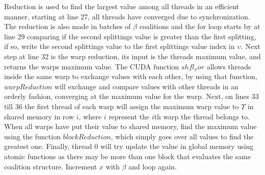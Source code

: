 \documentclass{llncs}
\begin{document}
Reduction is used to find the largest value among all threads in an efficient manner, starting at line 27, all threads have converged due to synchronization. The reduction is also made in batches of $\beta$ coalitions and the for loop starts by at line 29 comparing if the second splittings value is greater than the first splitting, if so, write the second splittings value to the first splittings value index in $\upsilon$. Next step at line 32 is the warp reduction, its input is the threads maximum value, and returns the warps maximum value. The CUDA function $shfl_xor$ allows threads inside the same warp to exchange values with each other, by using that function, $warpReduction$ will exchange and compare values with other threads in an orderly fashion, converging at the maximum value for the warp. Next, on lines 33 till 36 the first thread of each warp will assign the maximum warp value to $\Upsilon$ in shared memory in row $i$, where $i$ represent the $i$th warp the thread belongs to. When all warps have put their value to shared memory, find the maximum value using the function $blockReduction$, which simply goes over all values to find the greatest one. Finally, thread 0 will try update the value in global memory using atomic functions as there may be more than one block that evaluates the same coalition structure. Increment $x$ with $\beta$ and loop again. 
\end{document}
